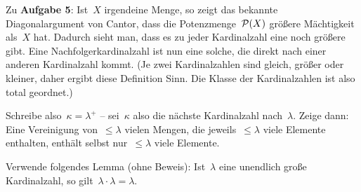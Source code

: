 \documentclass{uebblatt}
\begin{document}
Zu \textbf{Aufgabe 5}: Ist~$X$ irgendeine Menge, so zeigt das bekannte
Diagonalargument von Cantor, dass die Potenzmenge~$\P(X)$ größere Mächtigkeit
als~$X$ hat. Dadurch sieht man, dass es zu jeder Kardinalzahl eine noch größere
gibt. Eine Nachfolgerkardinalzahl ist nun eine solche, die direkt nach einer
anderen Kardinalzahl kommt. (Je zwei Kardinalzahlen sind gleich, größer oder
kleiner, daher ergibt diese Definition Sinn. Die Klasse der Kardinalzahlen ist
also total geordnet.)

Schreibe also~$\kappa = \lambda^+$ -- sei~$\kappa$ also die nächste
Kardinalzahl nach~$\lambda$. Zeige dann: Eine Vereinigung von~$\leq
\lambda$ vielen Mengen, die jeweils~$\leq \lambda$ viele Elemente enthalten,
enthält selbst nur~$\leq \lambda$ viele Elemente.

Verwende folgendes Lemma (ohne Beweis): Ist~$\lambda$ eine unendlich große
Kardinalzahl, so gilt~$\lambda \cdot \lambda = \lambda$.
\end{document}
